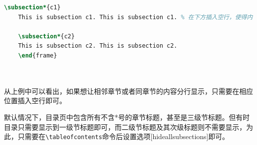 \begin{lstlisting}[language=TeX]
    \subsection*{c1}
    This is subsection c1. This is subsection c1. % 在下方插入空行，使得内容分行显示.

    \subsection*{c2}
    This is subsection c2. This is subsection c2.
    \end{frame}

    
\end{lstlisting}

从上例中可以看出，如果想让相邻章节或者同章节的内容分行显示，只需要在相应位置插入空行即可。

默认情况下，目录页中包含所有不含*号的章节标题，甚至是三级节标题。但有时目录只需要显示到一级节标题即可，而二级节标题及其次级标题则不需要显示，为此，只需要在\texttt{\textbackslash{}tableofcontents}命令后设置选项[hideallsubsections]即可。

